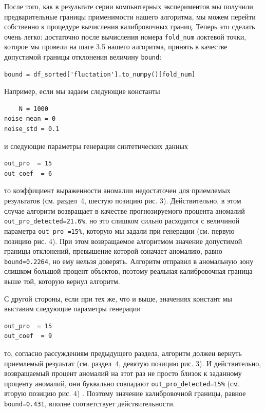 \documentclass[a4paper,12pt]{article}
\begin{document}
После того, как в результате серии компьютерных экспериментов мы получили предварительные границы применимости нашего алгоритма, мы можем перейти собственно к процедуре вычисления калибровочных границ. Теперь это сделать очень легко: достаточно после вычисления номера \texttt{fold\_num} локтевой точки, которое мы провели на шаге 3.5 нашего алгоритма, принять в качестве допустимой границы отклонения величину \texttt{bound}:
\begin{verbatim}
bound = df_sorted['fluctation'].to_numpy()[fold_num]
\end{verbatim}
Например, если мы задаем следующие константы
\begin{verbatim}
	N = 1000
noise_mean = 0
noise_std = 0.1
\end{verbatim}
и следующие параметры генерации синтетических данных
\begin{verbatim}
out_pro  = 15
out_coef  = 6
\end{verbatim}
то коэффициент выраженности аномалии недостаточен для приемлемых результатов (см. раздел 4, шестую позицию рис. 3).  Действительно, в этом случае алгоритм возвращает в качестве прогнозируемого процента аномалий \texttt{out\_pro\_detected=21.6\%}, но это слишком сильно расходится с величиной параметра \texttt{out\_pro =15\%}, которую мы задали при генерации (см. первую позицию рис. 4). При этом возвращаемое алгоритмом значение допустимой границы отклонений, превышение которой означает аномалию, равно \texttt{bound=0.2264}, но ему нельзя доверять. Алгоритм отправил в аномальную зону слишком большой процент объектов, поэтому реальная калибровочная граница выше той, которую вернул алгоритм.

С другой стороны, если при тех же, что и выше, значениях констант мы выставим следующие параметры генерации
\begin{verbatim}
out_pro  = 15
out_coef  = 9
\end{verbatim}
то, согласно рассуждениям предыдущего раздела, алгоритм должен вернуть приемлемый результат (см. раздел 4, девятую позицию рис. 3).  И действительно, возвращаемый процент аномалий на этот раз не просто близок к заданному проценту аномалий, они буквально совпадают \texttt{out\_pro\_detected=15\%} (см. вторую позицию рис. 4) . Поэтому значение калибровочной границы, равное \texttt{bound=0.431}, вполне соответствует действительности.
\end{document}
